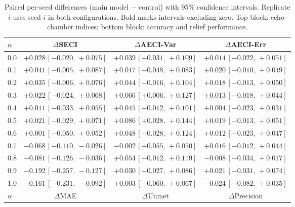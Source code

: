 
\begin{table}[h]
\caption{Paired per-seed differences (main model $-$ control) with 95\% confidence intervals. Replicate $i$ uses seed $i$ in both configurations. Bold marks intervals excluding zero. Top block: echo-chamber indices; bottom block: accuracy and relief performance.}\label{tab:s11deltas}
\footnotesize
\setlength{\tabcolsep}{4pt}
\begin{tabular}{@{}lccc@{}}
\toprule
$\alpha$ & $\Delta$SECI & $\Delta$AECI-Var & $\Delta$AECI-Err \\
\midrule
0.0 & $+0.028\,[-0.020,\,+0.075]$ & $+0.039\,[-0.031,\,+0.109]$ & $+0.014\,[-0.022,\,+0.051]$ \\
0.1 & $+0.041\,[-0.005,\,+0.087]$ & $+0.017\,[-0.048,\,+0.083]$ & $+0.020\,[-0.010,\,+0.049]$ \\
0.2 & $+0.035\,[-0.006,\,+0.076]$ & $+0.044\,[-0.016,\,+0.104]$ & $+0.018\,[-0.013,\,+0.050]$ \\
0.3 & $+0.022\,[-0.024,\,+0.068]$ & $\mathbf{+0.066}\,[+0.006,\,+0.127]$ & $+0.013\,[-0.018,\,+0.044]$ \\
0.4 & $+0.011\,[-0.033,\,+0.055]$ & $+0.045\,[-0.012,\,+0.101]$ & $+0.004\,[-0.023,\,+0.031]$ \\
0.5 & $+0.021\,[-0.029,\,+0.071]$ & $\mathbf{+0.086}\,[+0.028,\,+0.144]$ & $+0.019\,[-0.013,\,+0.051]$ \\
0.6 & $+0.001\,[-0.050,\,+0.052]$ & $+0.048\,[-0.028,\,+0.124]$ & $+0.012\,[-0.023,\,+0.047]$ \\
0.7 & $\mathbf{-0.068}\,[-0.110,\,-0.026]$ & $-0.002\,[-0.055,\,+0.050]$ & $+0.016\,[-0.012,\,+0.044]$ \\
0.8 & $\mathbf{-0.081}\,[-0.126,\,-0.036]$ & $+0.054\,[-0.012,\,+0.119]$ & $-0.008\,[-0.034,\,+0.017]$ \\
0.9 & $\mathbf{-0.192}\,[-0.257,\,-0.127]$ & $+0.030\,[-0.027,\,+0.086]$ & $+0.021\,[-0.031,\,+0.074]$ \\
1.0 & $\mathbf{-0.161}\,[-0.231,\,-0.092]$ & $+0.003\,[-0.060,\,+0.067]$ & $-0.024\,[-0.082,\,+0.035]$ \\
\midrule
$\alpha$ & $\Delta$MAE & $\Delta$Unmet & $\Delta$Precision \\

\end{tabular}
\end{table}
